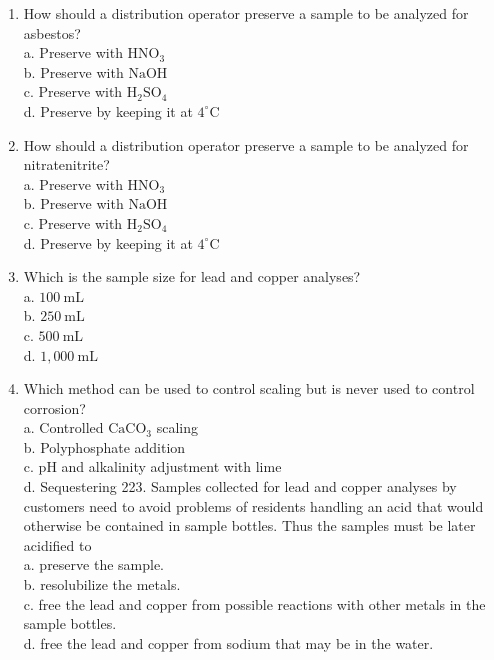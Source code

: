 \documentclass[10pt]{article}
\begin{document}
\begin{enumerate}
  \item How should a distribution operator preserve a sample to be analyzed for asbestos?\\
a. Preserve with $\mathrm{HNO}_{3}$\\
b. Preserve with $\mathrm{NaOH}$\\
c. Preserve with $\mathrm{H}_{2} \mathrm{SO}_{4}$\\
d. Preserve by keeping it at $4^{\circ} \mathrm{C}$

  \item How should a distribution operator preserve a sample to be analyzed for nitratenitrite?\\
a. Preserve with $\mathrm{HNO}_{3}$\\
b. Preserve with $\mathrm{NaOH}$\\
c. Preserve with $\mathrm{H}_{2} \mathrm{SO}_{4}$\\
d. Preserve by keeping it at $4^{\circ} \mathrm{C}$

  \item Which is the sample size for lead and copper analyses?\\
a. $100 \mathrm{~mL}$\\
b. $250 \mathrm{~mL}$\\
c. $500 \mathrm{~mL}$\\
d. $1,000 \mathrm{~mL}$

  \item Which method can be used to control scaling but is never used to control corrosion?\\
a. Controlled $\mathrm{CaCO}_{3}$ scaling\\
b. Polyphosphate addition\\
c. $\mathrm{pH}$ and alkalinity adjustment with lime\\
d. Sequestering 223. Samples collected for lead and copper analyses by customers need to avoid problems of residents handling an acid that would otherwise be contained in sample bottles. Thus the samples must be later acidified to\\
a. preserve the sample.\\
b. resolubilize the metals.\\
c. free the lead and copper from possible reactions with other metals in the sample bottles.\\
d. free the lead and copper from sodium that may be in the water.


\end{enumerate}
\end{document}
